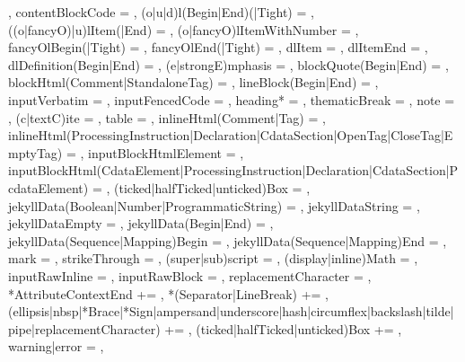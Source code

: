 {{    },
  contentBlockCode = {%
    },
  (o|u|d)l(Begin|End)(|Tight) = {%
    },
  ((o|fancyO)|u)lItem(|End) = {%
    },
  (o|fancyO)lItemWithNumber = {%
    },
  fancyOlBegin(|Tight) = {%
    },
  fancyOlEnd(|Tight) = {%
    },
  dlItem = {%
    },
  dlItemEnd = {%
    },
  dlDefinition(Begin|End) = {%
    },
  (e|strongE)mphasis = {%
    },
  blockQuote(Begin|End) = {%
    },
  blockHtml(Comment|StandaloneTag) = {%
    },
  lineBlock(Begin|End) = {%
    },
  inputVerbatim = {%
    },
  inputFencedCode = {%
    },
  heading* = {%
    },
  thematicBreak = {%
    },
  note = {%
    },
  (c|textC)ite = {%
    },
  table = {%
    },
  inlineHtml(Comment|Tag) = {%
    },
  inlineHtml(ProcessingInstruction|Declaration|CdataSection|OpenTag|CloseTag|EmptyTag) = {%
    },
  inputBlockHtmlElement = {%
    },
  inputBlockHtml(CdataElement|ProcessingInstruction|Declaration|CdataSection|PcdataElement) = {%
    },
  (ticked|halfTicked|unticked)Box = {%
    },
  jekyllData(Boolean|Number|ProgrammaticString) = {%
    },
  jekyllDataString = {%
    },
  jekyllDataEmpty = {%
    },%
  jekyllData(Begin|End) = {%
    },
  jekyllData(Sequence|Mapping)Begin = {%
    },
  jekyllData(Sequence|Mapping)End = {%
    },
  mark = {%
    },
  strikeThrough = {%
    },
  (super|sub)script = {%
    },
  (display|inline)Math = {%
    },
  inputRawInline = {%
    },
  inputRawBlock = {%
    },
  replacementCharacter = {%
    },
  *AttributeContextEnd += {\GOBBLE},
  *(Separator|LineBreak) += {\GOBBLE},
  (ellipsis|nbsp|*Brace|*Sign|ampersand|underscore|hash|circumflex|backslash|tilde|pipe|replacementCharacter) += {\GOBBLE},
  (ticked|halfTicked|unticked)Box += {\GOBBLE},
  warning|error = {%
    },
}%
